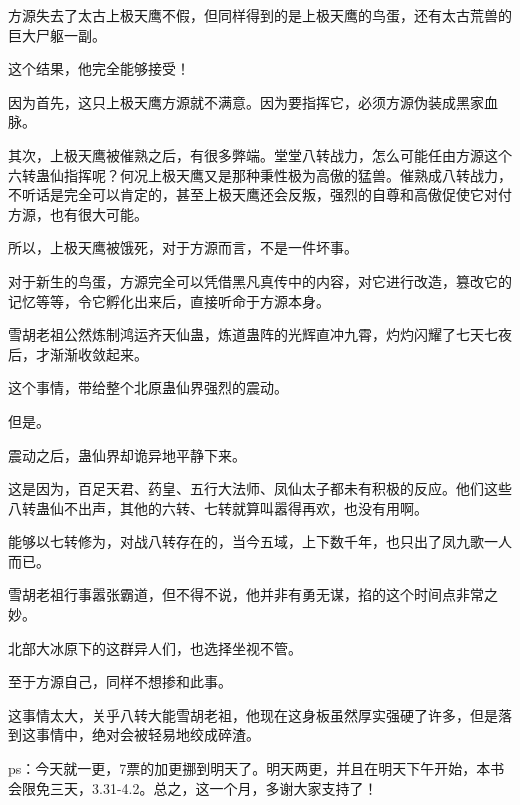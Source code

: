 \begin{this_body}
方源失去了太古上极天鹰不假，但同样得到的是上极天鹰的鸟蛋，还有太古荒兽的巨大尸躯一副。

这个结果，他完全能够接受！

因为首先，这只上极天鹰方源就不满意。因为要指挥它，必须方源伪装成黑家血脉。

其次，上极天鹰被催熟之后，有很多弊端。堂堂八转战力，怎么可能任由方源这个六转蛊仙指挥呢？何况上极天鹰又是那种秉性极为高傲的猛兽。催熟成八转战力，不听话是完全可以肯定的，甚至上极天鹰还会反叛，强烈的自尊和高傲促使它对付方源，也有很大可能。

所以，上极天鹰被饿死，对于方源而言，不是一件坏事。

对于新生的鸟蛋，方源完全可以凭借黑凡真传中的内容，对它进行改造，篡改它的记忆等等，令它孵化出来后，直接听命于方源本身。

雪胡老祖公然炼制鸿运齐天仙蛊，炼道蛊阵的光辉直冲九霄，灼灼闪耀了七天七夜后，才渐渐收敛起来。

这个事情，带给整个北原蛊仙界强烈的震动。

但是。

震动之后，蛊仙界却诡异地平静下来。

这是因为，百足天君、药皇、五行大法师、凤仙太子都未有积极的反应。他们这些八转蛊仙不出声，其他的六转、七转就算叫嚣得再欢，也没有用啊。

能够以七转修为，对战八转存在的，当今五域，上下数千年，也只出了凤九歌一人而已。

雪胡老祖行事嚣张霸道，但不得不说，他并非有勇无谋，掐的这个时间点非常之妙。

北部大冰原下的这群异人们，也选择坐视不管。

至于方源自己，同样不想掺和此事。

这事情太大，关乎八转大能雪胡老祖，他现在这身板虽然厚实强硬了许多，但是落到这事情中，绝对会被轻易地绞成碎渣。

ps：今天就一更，7票的加更挪到明天了。明天两更，并且在明天下午开始，本书会限免三天，3.31-4.2。总之，这一个月，多谢大家支持了！

\end{this_body}

